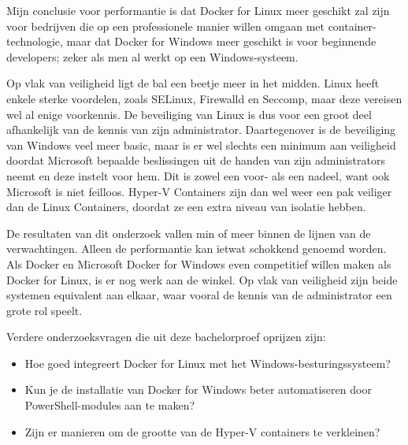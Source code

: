 Mijn conclusie voor performantie is dat Docker for Linux meer geschikt zal zijn voor bedrijven die op een professionele manier willen omgaan met container-technologie, maar dat Docker for Windows meer geschikt is voor beginnende developers; zeker als men al werkt op een Windows-systeem.

Op vlak van veiligheid ligt de bal een beetje meer in het midden. Linux heeft enkele sterke voordelen, zoals SELinux, Firewalld en Seccomp, maar deze vereisen wel al enige voorkennis. De beveiliging van Linux is dus voor een groot deel afhankelijk van de kennis van zijn administrator. Daartegenover is de beveiliging van Windows veel meer basic, maar is er wel slechts een minimum aan veiligheid doordat Microsoft bepaalde beslissingen uit de handen van zijn administrators neemt en deze instelt voor hem. Dit is zowel een voor- als een nadeel, want ook Microsoft is niet feilloos. Hyper-V Containers zijn dan wel weer een pak veiliger dan de Linux Containers, doordat ze een extra niveau van isolatie hebben.

De resultaten van dit onderzoek vallen min of meer binnen de lijnen van de verwachtingen. Alleen de performantie kan ietwat schokkend genoemd worden. Als Docker en Microsoft Docker for Windows even competitief willen maken als Docker for Linux, is er nog werk aan de winkel. Op vlak van veiligheid zijn beide systemen equivalent aan elkaar, waar vooral de kennis van de administrator een grote rol speelt.

Verdere onderzoeksvragen die uit deze bachelorproef oprijzen zijn:
\begin{itemize}[noitemsep]
	\item Hoe goed integreert Docker for Linux met het Windows-besturingssysteem?
	\item Kun je de installatie van Docker for Windows beter automatiseren door PowerShell-modules aan te maken?
	\item Zijn er manieren om de grootte van de Hyper-V containers te verkleinen?
\end{itemize}


